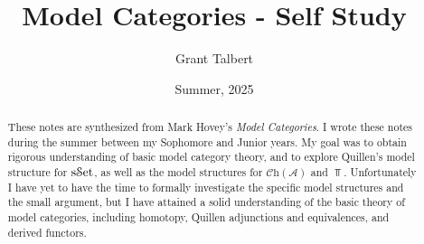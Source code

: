 \documentclass[11pt, letterpaper]{report}
\title{Model Categories - Self Study}
\date{Summer, 2025}
\author{Grant Talbert}
\newcommand{\Ch}{\mathcal{C}\mathrm{h}}
\begin{document}
\maketitle
\begin{abstract}
	These notes are synthesized from Mark Hovey's \emph{Model Categories}. I wrote these notes during the summer between my Sophomore and Junior years. My goal was to obtain rigorous understanding of basic model category theory, and to explore Quillen's model structure for $\mathrm{s}\mathcal{S}\mathrm{et}$, as well as the model structures for $\Ch(\mathcal{A} )$ and $\Top $. Unfortunately I have yet to have the time to formally investigate the specific model structures and the small argument, but I have attained a solid understanding of the basic theory of model categories, including homotopy, Quillen adjunctions and equivalences, and derived functors.
\end{abstract}
\tableofcontents
\end{document}
